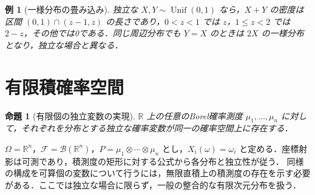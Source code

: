 \documentclass[a5paper,10pt,onecolumn]{jsarticle}
\makeatletter
\theoremstyle{mathnotetheorem}
\newtheorem{proposition}[theorem]{命題}
\newtheorem{example}[theorem]{例}
\renewcommand{\proofname}{証明}
\renewenvironment{proof}[1][\proofname]{%
  \par\pushQED{\qed}\normalfont\topsep4\p@\@plus2\p@\relax
  \trivlist\item[\hskip\labelsep\bfseries #1]\ignorespaces
}{\popQED\endtrivlist\@endpefalse}
\newcommand{\R}{\mathbb{R}}
\newcommand{\F}{\mathcal F}
\newcommand{\B}{\mathcal B}
\newcommand{\1}{\mathbf{1}}
\makeatother
\begin{document}
\begin{example}[一様分布の畳み込み]
独立な $X,Y\sim\operatorname{Unif}(0,1)$ なら，$X+Y$ の密度は区間 $(0,1)\cap(z-1,z)$ の長さであり，$0<z<1$ では $z$，$1\le z<2$ では $2-z$，その他では0である．同じ周辺分布でも $Y=X$ のときは $2X$ の一様分布となり，独立な場合と異なる．
\end{example}

\section{有限積確率空間}
\begin{proposition}[有限個の独立変数の実現]
$\R$ 上の任意のBorel確率測度 $\mu_1,\ldots,\mu_n$ に対して，それぞれを分布とする独立な確率変数が同一の確率空間上に存在する．
\end{proposition}
\begin{proof}
$\Omega=\R^n$，$\F=\B(\R^n)$，$P=\mu_1\otimes\cdots\otimes\mu_n$ とし，$X_i(\omega)=\omega_i$ と定める．座標射影は可測であり，積測度の矩形に対する公式から各分布と独立性が従う．
\end{proof}
同様の構成を可算個の変数について行うには，無限直積上の積測度の存在を示す必要がある．ここでは独立な場合に限らず，一般の整合的な有限次元分布を扱う．
\end{document}
